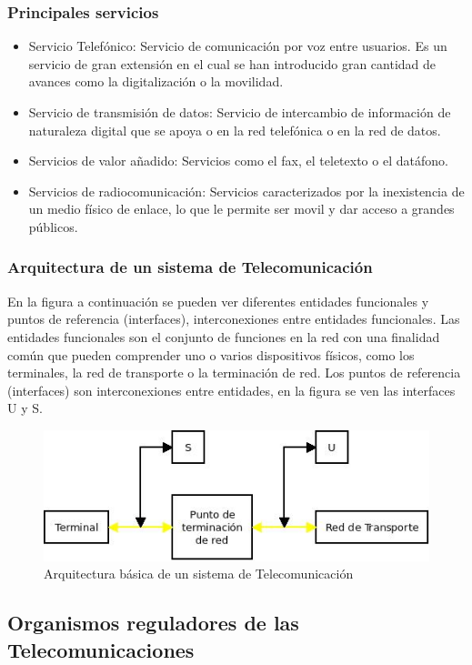\subsubsection{Principales servicios}
\begin{itemize}
	\item Servicio Telefónico: Servicio de comunicación por voz entre usuarios. Es un servicio de gran extensión en el cual se han introducido gran cantidad de avances como la digitalización o la movilidad.
	\item Servicio de transmisión de datos: Servicio de intercambio de información de naturaleza digital que se apoya o en la red telefónica o en la red de datos.
	\item Servicios de valor añadido: Servicios como el fax, el teletexto o el datáfono.
	\item Servicios de radiocomunicación: Servicios caracterizados por la inexistencia de un medio físico de enlace, lo que le permite ser movil y dar acceso a grandes públicos.
\end{itemize}
\subsubsection{Arquitectura de un sistema de Telecomunicación}
En la figura a continuación se pueden ver diferentes entidades funcionales y puntos de referencia (interfaces), interconexiones entre entidades funcionales. Las entidades funcionales son el conjunto de funciones en la red con una finalidad común que pueden comprender uno o varios dispositivos físicos, como los terminales, la red de transporte o la terminación de red. Los puntos de referencia (interfaces) son interconexiones entre entidades, en la figura se ven las interfaces U y S.
\begin{figure}[H]
\centering
\includegraphics[width=\textwidth]{Imagen/arquisistemateleco.jpg}
\caption{Arquitectura básica de un sistema de Telecomunicación}
\label{}
\end{figure}
\subsection{Organismos reguladores de las Telecomunicaciones}
